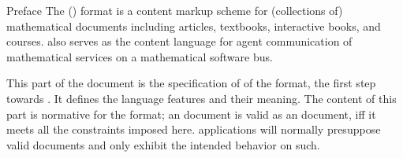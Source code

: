 
\begin{omgroup}[id=preface,display=flow]{Preface}
 The \omdoc (\explainomdocacronym) format is a content markup scheme for (collections of)
mathematical documents including articles, textbooks, interactive books, and courses.
\omdoc also serves as the content language for agent communication of mathematical
services on a mathematical software bus.

This {\ifbook part of the {\report}\else document\fi} is the specification of {}
of the \omdoc format, the first step towards {}. It defines the \omdoc
language features and their meaning. The content of this part is normative for the
\omdoc format; an \omdoc document is valid as an \omdoc document, iff it meets all
the constraints imposed here. \omdoc applications will normally presuppose valid
\omdoc documents and only exhibit the intended behavior on such.
\end{omgroup}





